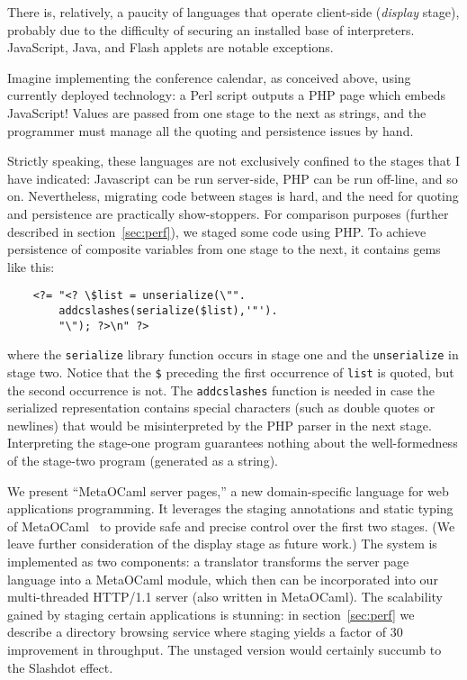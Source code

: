 \documentclass{elsart}
\def\MOC{MetaOCaml\xspace}
\begin{document}
There is, relatively, a paucity of languages that operate client-side
(\emph{display} stage), probably due to the difficulty of securing an
installed base of interpreters.  JavaScript, Java, and Flash applets are
notable exceptions.  

Imagine implementing the conference calendar, as conceived
above, using currently deployed technology: a Perl script
outputs a PHP page which embeds JavaScript!  Values are
passed from one stage to the next as strings, and the
programmer must manage all the quoting and persistence
issues by hand.

Strictly speaking, these languages are not exclusively confined to the
stages that I have indicated: Javascript can be run server-side, PHP
can be run off-line, and so on.  Nevertheless, migrating code between
stages is hard, and the need for quoting and persistence are
practically show-stoppers.  For comparison purposes (further described
in section~\ref{sec:perf}), we staged some code using PHP.  To achieve
persistence of composite variables from one stage to the next, it
contains gems like this:\label{php-gem}
\begin{verbatim}
    <?= "<? \$list = unserialize(\"".
        addcslashes(serialize($list),'"').
        "\"); ?>\n" ?>
\end{verbatim}
where the \texttt{serialize} library function occurs in stage one and
the \texttt{unserialize} in stage two.  Notice that the \verb+$+ %
preceding the first occurrence of \verb+list+ is quoted, but the
second occurrence is not.  The \texttt{addcslashes} function is needed
in case the serialized representation contains special characters
(such as double quotes or newlines) that would be misinterpreted by
the PHP parser in the next stage.  Interpreting the stage-one program
guarantees nothing about the well-formedness of the stage-two program
(generated as a string).

We present ``\MOC server pages,'' a new domain-specific language for
web applications programming.  It leverages the staging annotations
and static typing of \MOC~\cite{calcagno03meta,taha00metaml} to
provide safe and precise control over the first two stages.  (We leave
further consideration of the display stage as future work.)  The
system is implemented as two components: a translator transforms the
server page language into a \MOC module, which then can be
incorporated into our multi-threaded HTTP/1.1 server (also written in
\MOC).  The scalability gained by staging certain applications is
stunning: in section~\ref{sec:perf} we describe a directory browsing
service where staging yields a factor of 30 improvement in throughput.
The unstaged version would certainly succumb to the Slashdot effect.
\end{document}
